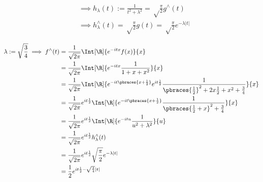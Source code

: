 \begin{solution}
\begin{align*}
    & \implies
    h_\lambda(t)
    :=
    \frac{1}{t^2 + \lambda^2}
    =
    \sqrt \frac{\pi}{2}
    g^\wedge(t) \\
    & \implies
    h_\lambda^\wedge(t)
    =
    \sqrt \frac{\pi}{2}
    g(t)
    =
    \sqrt \frac{\pi}{2}
    e^{-\lambda |t|}
\end{align*}

\begin{align*}
    \lambda := \sqrt{\frac{3}{4}}
    \implies
    f^\wedge(t)
    & =
    \frac{1}{\sqrt{2 \pi}}
    \Int[\R]
    {
        e^{-i t x}
        f(x)
    }{x} \\
    & =
    \frac{1}{\sqrt{2 \pi}}
    \Int[\R]
    {
        e^{-i t x}
        \frac{1}{1 + x + x^2}
    }{x} \\
    & =
    \frac{1}{\sqrt{2 \pi}}
    \Int[\R]
    {
        e^{-i t \pbraces{x + \frac{1}{2}}}
        e^{i t \frac{1}{2}}
        \frac{1}
        {
            \pbraces{\frac{1}{2}}^2
            +
            2 x \frac{1}{2}
            +
            x^2
            +
            \frac{3}{4}
        }
    }{x} \\
    & =
    \frac{1}{\sqrt{2 \pi}}
    e^{i t \frac{1}{2}}
    \Int[\R]
    {
        e^{-i t \pbraces{x + \frac{1}{2}}}
        \frac{1}
        {
            \pbraces
            {
                \frac{1}{2}
                +
                x
            }^2
            +
            \frac{3}{4}
        }
    }{x} \\
    & =
    \frac{1}{\sqrt{2 \pi}}
    e^{i t \frac{1}{2}}
    \Int[\R]
    {
        e^{-i t u}
        \frac{1}
        {
            u^2
            +
            \lambda^2
        }
    }{u} \\
    & =
    \frac{1}{\sqrt{2 \pi}}
    e^{i t \frac{1}{2}}
    h_\lambda^\wedge(t) \\
    & =
    \frac{1}{\sqrt{2 \pi}}
    e^{i t \frac{1}{2}}
    \sqrt \frac{\pi}{2}
    e^{-\lambda |t|} \\
    & =
    \frac{1}{2}
    e^{
        i t \frac{1}{2}
        -
        \sqrt{\frac{3}{4}} |t|
    }
\end{align*}

\end{solution}

